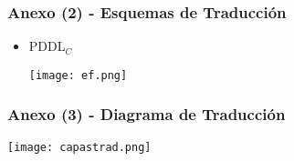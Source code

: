 \documentclass[bigger]{beamer}
\begin{document}
\begin{frame}
\frametitle{Anexo (2) - Esquemas de Traducción}
\label{sec-6.10}
\begin{itemize}

\item PDDL$_{C}$
\label{sec-6.10.1}%
\begin{center}\texttt{[image: ef.png]}\end{center}

\end{itemize} %
\end{frame}
\begin{frame}
\frametitle{Anexo (3) - Diagrama de Traducción}
\label{sec-6.11}

\begin{center} \texttt{[image: capastrad.png]} \end{center}
\end{frame}
\end{document}
